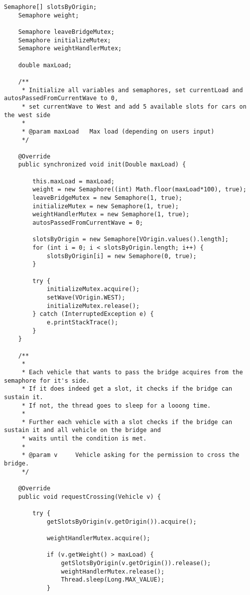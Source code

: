 \begin{itemize}
\begin{lstlisting}[style=java]
    Semaphore[] slotsByOrigin;
    Semaphore weight;

    Semaphore leaveBridgeMutex;
    Semaphore initializeMutex;
    Semaphore weightHandlerMutex;

    double maxLoad;

    /**
     * Initialize all variables and semaphores, set currentLoad and autosPassedFromCurrentWave to 0,
     * set currentWave to West and add 5 available slots for cars on the west side
     *
     * @param maxLoad	Max load (depending on users input)
     */

    @Override
    public synchronized void init(Double maxLoad) {

        this.maxLoad = maxLoad;
        weight = new Semaphore((int) Math.floor(maxLoad*100), true);
        leaveBridgeMutex = new Semaphore(1, true);
        initializeMutex = new Semaphore(1, true);
        weightHandlerMutex = new Semaphore(1, true);
        autosPassedFromCurrentWave = 0;

        slotsByOrigin = new Semaphore[VOrigin.values().length];
        for (int i = 0; i < slotsByOrigin.length; i++) {
            slotsByOrigin[i] = new Semaphore(0, true);
        }

        try {
            initializeMutex.acquire();
            setWave(VOrigin.WEST);
            initializeMutex.release();
        } catch (InterruptedException e) {
            e.printStackTrace();
        }
    }

    /**
     *
     * Each vehicle that wants to pass the bridge acquires from the semaphore for it's side.
     * If it does indeed get a slot, it checks if the bridge can sustain it.
     * If not, the thread goes to sleep for a looong time.
     *
     * Further each vehicle with a slot checks if the bridge can sustain it and all vehicle on the bridge and
     * waits until the condition is met.
     *
     * @param v		Vehicle asking for the permission to cross the bridge.
     */

    @Override
    public void requestCrossing(Vehicle v) {

        try {
            getSlotsByOrigin(v.getOrigin()).acquire();

            weightHandlerMutex.acquire();

            if (v.getWeight() > maxLoad) {
                getSlotsByOrigin(v.getOrigin()).release();
                weightHandlerMutex.release();
                Thread.sleep(Long.MAX_VALUE);
            }


\end{lstlisting}
\end{itemize}
